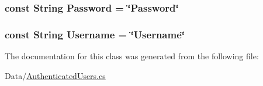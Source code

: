 \subsubsection[{Password}]{\setlength{\rightskip}{0pt plus 5cm}const String Password = \char`\"{}Password\char`\"{}}\label{classOTA_1_1Data_1_1AuthenticatedUsers_1_1UserTable_1_1ColumnNames_acb13a5b49b296eb734f299ca7a90919c}
\hypertarget{classOTA_1_1Data_1_1AuthenticatedUsers_1_1UserTable_1_1ColumnNames_a1ae44703cf04681ce1a04e0716b3461a}{}
\subsubsection[{Username}]{\setlength{\rightskip}{0pt plus 5cm}const String Username = \char`\"{}Username\char`\"{}}\label{classOTA_1_1Data_1_1AuthenticatedUsers_1_1UserTable_1_1ColumnNames_a1ae44703cf04681ce1a04e0716b3461a}


The documentation for this class was generated from the following file\+:\begin{DoxyCompactItemize}
\item 
Data/\hyperlink{AuthenticatedUsers_8cs}{Authenticated\+Users.\+cs}\end{DoxyCompactItemize}
